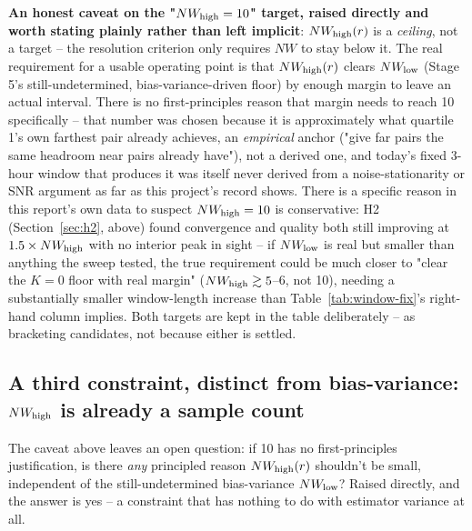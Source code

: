 \documentclass[11pt]{article}
\begin{document}
\textbf{An honest caveat on the "$NW_{\rm high}=10$" target, raised directly and worth stating
plainly rather than left implicit}: $NW_{\rm high}(r)$ is a \emph{ceiling}, not a target -- the
resolution criterion only requires $NW$ to stay below it. The real requirement for a usable
operating point is that $NW_{\rm high}(r)$ clears $NW_{\rm low}$ (Stage 5's still-undetermined,
bias-variance-driven floor) by enough margin to leave an actual interval. There is no
first-principles reason that margin needs to reach 10 specifically -- that number was chosen
because it is approximately what quartile 1's own farthest pair already achieves, an
\emph{empirical} anchor ("give far pairs the same headroom near pairs already have"), not a
derived one, and today's fixed 3-hour window that produces it was itself never derived from a
noise-stationarity or SNR argument as far as this project's record shows. There is a specific
reason in this report's own data to suspect $NW_{\rm high}=10$ is conservative: H2
(Section~\ref{sec:h2}, above) found convergence and quality both still improving at
$1.5\times NW_{\rm high}$ with no interior peak in sight -- if $NW_{\rm low}$ is real but smaller
than anything the sweep tested, the true requirement could be much closer to "clear the $K=0$
floor with real margin" ($NW_{\rm high}\gtrsim 5$--$6$, not 10), needing a substantially smaller
window-length increase than Table~\ref{tab:window-fix}'s right-hand column implies. Both targets
are kept in the table deliberately -- as bracketing candidates, not because either is settled.

\subsection{A third constraint, distinct from bias-variance: $NW_{\rm high}$ is already a sample
count}
\label{sec:rayleigh}

The caveat above leaves an open question: if 10 has no first-principles justification, is there
\emph{any} principled reason $NW_{\rm high}(r)$ shouldn't be small, independent of the
still-undetermined bias-variance $NW_{\rm low}$? Raised directly, and the answer is yes -- a
constraint that has nothing to do with estimator variance at all.
\end{document}
